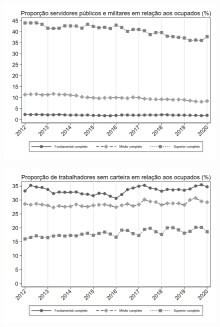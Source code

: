 \begin{frame}[label=_composicao_demografica_educacao_prop_militar]{}
\textit{\hyperlink{_composicao_demografica_educacao}{}}
\begin{figure}
  \centering
  \includegraphics[width=1.0\linewidth]{../../analysis/output/composicao_demografica/educacao/_composicao_demografica_educacao_prop_militar.png}
  \caption{}
  \label{fig:_composicao_demografica_educacao_prop_militar}
\end{figure}
\end{frame}


\begin{frame}[label=_composicao_demografica_educacao_prop_empregadoSC]{}
\textit{\hyperlink{_composicao_demografica_educacao}{}}
\begin{figure}
  \centering
  \includegraphics[width=1.0\linewidth]{../../analysis/output/composicao_demografica/educacao/_composicao_demografica_educacao_prop_empregadoSC.png}
  \caption{}
  \label{fig:_composicao_demografica_educacao_prop_empregadoSC}
\end{figure}
\end{frame}

